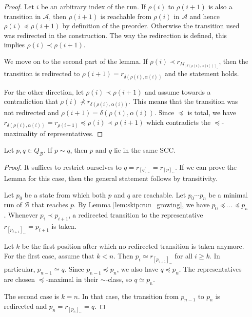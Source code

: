 \begin{proof}
	Let $i$ be an arbitrary index of the run. If $\rho(i)$ to $\rho(i+1)$ is also a transition in $\mathcal{A}$, then $\rho(i+1)$ is reachable from $\rho(i)$ in $\mathcal{A}$ and hence $\rho(i) \preceq \rho(i+1)$ by definition of the preorder. Otherwise the transition used was redirected in the construction. The way the redirection is defined, this implies $\rho(i) \prec \rho(i+1)$.
	
	We move on to the second part of the lemma. If $\rho(i) \prec r_{M_{[\delta(\rho(i), \alpha(i))]_\sim}}$, then the transition is redirected to $\rho(i+1) = r_{\delta(\rho(i), \alpha(i))}$ and the statement holds. 
	
	For the other direction, let $\rho(i) \prec \rho(i+1)$ and assume towards a contradiction that $\rho(i) \not\prec r_{\delta(\rho(i), \alpha(i))}$. This means that the transition was not redirected and $\rho(i+1) = \delta(\rho(i), \alpha(i))$. Since $\preceq$ is total, we have $r_{\delta(\rho(i), \alpha(i))} = r_{\rho(i+1)} \preceq \rho(i) \prec \rho(i+1)$ which contradicts the $\preceq$-maximality of representatives.
\end{proof}

\begin{lem}
\label{lem:skip:equiv_same_scc}
	Let $p, q \in Q_\mathcal{B}$. If $p \sim q$, then $p$ and $q$ lie in the same SCC. 
\end{lem}

\begin{proof}
	It suffices to restrict ourselves to $q = r_{[q]_\sim} = r_{[p]_\sim}$. If we can prove the Lemma for this case, then the general statement follows by transitivity.
	
	Let $p_0$ be a state from which both $p$ and $q$ are reachable. Let $p_0 \cdots p_n$ be a minimal run of $\mathcal{B}$ that reaches $p$. By Lemma \ref{lem:skip:run_growing}, we have $p_0 \preceq \dots \preceq p_n$. Whenever $p_i \prec p_{i+1}$, a redirected transition to the representative $r_{[p_{i+1}]_\sim} = p_{i+1}$ is taken. 
	
	Let $k$ be the first position after which no redirected transition is taken anymore. For the first case, assume that $k < n$. Then $p_i \simeq r_{[p_{i+1}]_\sim}$ for all $i \geq k$. In particular, $p_{n-1} \simeq q$. Since $p_{n-1} \preceq p_n$, we also have $q \preceq p_n$. The representatives are chosen $\preceq$-maximal in their $\sim$-class, so $q \simeq p_n$.
	
	The second case is $k = n$. In that case, the transition from $p_{n-1}$ to $p_n$ is redirected and $p_n = r_{[p_n]_\sim} = q$.
\end{proof}


